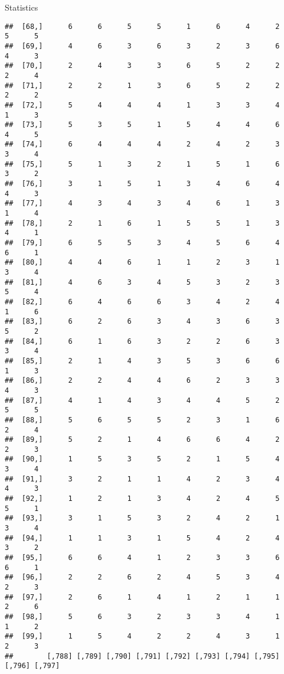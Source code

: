 \documentclass[
  ignorenonframetext,
]{beamer}
\begin{document}
\begin{frame}[fragile]{Statistics}
\begin{verbatim}
##  [68,]      6      6      5      5      1      6      4      2      5      5
##  [69,]      4      6      3      6      3      2      3      6      4      3
##  [70,]      2      4      3      3      6      5      2      2      2      4
##  [71,]      2      2      1      3      6      5      2      2      2      2
##  [72,]      5      4      4      4      1      3      3      4      1      3
##  [73,]      5      3      5      1      5      4      4      6      4      5
##  [74,]      6      4      4      4      2      4      2      3      3      4
##  [75,]      5      1      3      2      1      5      1      6      3      2
##  [76,]      3      1      5      1      3      4      6      4      4      3
##  [77,]      4      3      4      3      4      6      1      3      1      4
##  [78,]      2      1      6      1      5      5      1      3      4      1
##  [79,]      6      5      5      3      4      5      6      4      6      1
##  [80,]      4      4      6      1      1      2      3      1      3      4
##  [81,]      4      6      3      4      5      3      2      3      5      4
##  [82,]      6      4      6      6      3      4      2      4      1      6
##  [83,]      6      2      6      3      4      3      6      3      5      2
##  [84,]      6      1      6      3      2      2      6      3      3      4
##  [85,]      2      1      4      3      5      3      6      6      1      3
##  [86,]      2      2      4      4      6      2      3      3      4      3
##  [87,]      4      1      4      3      4      4      5      2      5      5
##  [88,]      5      6      5      5      2      3      1      6      2      4
##  [89,]      5      2      1      4      6      6      4      2      2      3
##  [90,]      1      5      3      5      2      1      5      4      3      4
##  [91,]      3      2      1      1      4      2      3      4      4      3
##  [92,]      1      2      1      3      4      2      4      5      5      1
##  [93,]      3      1      5      3      2      4      2      1      3      4
##  [94,]      1      1      3      1      5      4      2      4      3      2
##  [95,]      6      6      4      1      2      3      3      6      6      1
##  [96,]      2      2      6      2      4      5      3      4      2      3
##  [97,]      2      6      1      4      1      2      1      1      2      6
##  [98,]      5      6      3      2      3      3      4      1      1      2
##  [99,]      1      5      4      2      2      4      3      1      2      3
##        [,788] [,789] [,790] [,791] [,792] [,793] [,794] [,795] [,796] [,797]

\end{verbatim}
\end{frame}
\end{document}
